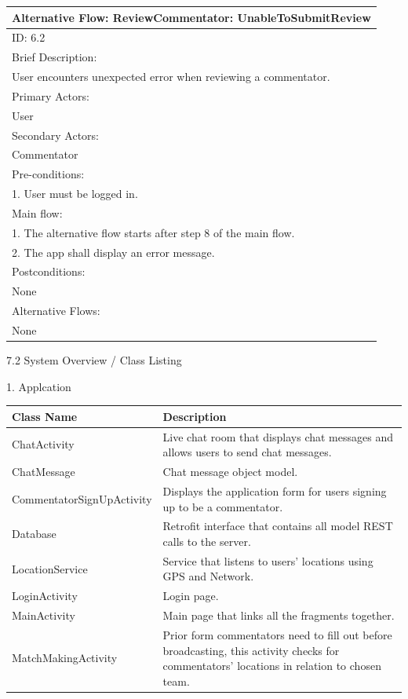 \documentclass{article}
\begin{document}
\begin{flushleft}
\begin{longtable}[l]{|l|}
Alternative Flow: ReviewCommentator: UnableToSubmitReview\\
\hline
ID: 6.2\\
\hline
Brief Description: \\
User encounters unexpected error when reviewing a commentator.\\
\hline
Primary Actors:\\
User\\
\hline
Secondary Actors:\\
Commentator\\
\hline
Pre-conditions:\\
1. User must be logged in.\\
\hline
Main flow:\\
1. The alternative flow starts after step 8 of the main flow.\\
2. The app shall display an error message.\\
\hline
Postconditions:\\
None\\
\hline
Alternative Flows:\\
None\\
\hline
\end{longtable}
{\Large 7.2 System Overview / Class Listing}\par
{\large 1. Applcation}\par
\begin{longtable}[l]{|l|p{10cm}|}
\hline
\textbf{Class Name} & \textbf{Description}\\
\hline
ChatActivity & Live chat room that displays chat messages and allows users to send chat messages.\\
\hline
ChatMessage & Chat message object model.\\
\hline
CommentatorSignUpActivity & Displays the application form for users signing up to be a commentator.\\
\hline
Database & Retrofit interface that contains all model REST calls to the server.\\
\hline
LocationService & Service that listens to users' locations using GPS and Network.\\
\hline
LoginActivity & Login page.\\
\hline
MainActivity & Main page that links all the fragments together.\\
\hline
MatchMakingActivity & Prior form commentators need to fill out before broadcasting, this activity checks for commentators' locations in relation to chosen team.\\

\end{longtable}
\end{flushleft}
\end{document}
